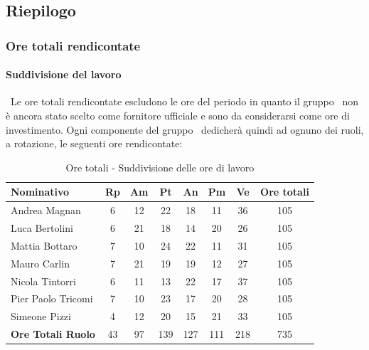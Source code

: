 \documentclass[./PianoDiProgetto.tex]{subfiles}
\begin{document}
\vspace{35mm}	
	
	\subsection{Riepilogo}
			\subsubsection{Ore totali rendicontate}
				\paragraph{Suddivisione del lavoro}\
					Le ore totali rendicontate escludono le ore del periodo \PerAR{} in quanto il gruppo \GRUPPO\ non è ancora stato scelto come fornitore ufficiale e sono da considerarsi come ore di investimento. Ogni componente del gruppo \GRUPPO\ dedicherà quindi ad ognuno dei ruoli, a rotazione, le seguenti ore rendicontate:
	
	\begin{table}[H]
		\begin{tabularx}{\textwidth}{l  * {6}{c}  c}
			\toprule
			\textbf{Nominativo} & \textbf{Rp} & \textbf{Am} & \textbf{Pt} 
						& \textbf{An} & \textbf{Pm} & \textbf{Ve} & \textbf{Ore totali} \\
			\midrule
			Andrea Magnan  & 6  & 12 & 22 & 18 & 11  & 36 & 105 \\
			Luca Bertolini  & 6 & 21 & 18 & 14 & 20 & 26 & 105 \\
			Mattia Bottaro  & 7  & 10 & 24 & 22 & 11  & 31 & 105 \\
			Mauro Carlin  & 7 & 21 & 19 & 19 & 12 & 27 & 105 \\
			Nicola Tintorri  & 6 & 11 & 13 & 22 & 17 & 37 & 105 \\
			Pier Paolo Tricomi  & 7 & 10 & 23 & 17 & 20 & 28 & 105 \\
			Simeone Pizzi & 4 & 12 & 20 & 15 & 21 & 33 & 105 \\
			\midrule
			\textbf{Ore Totali Ruolo} & 43    & 97   & 139   & 127   & 111 & 218   & 735 \\
			\bottomrule
		\end{tabularx}
		\caption{Ore totali - Suddivisione delle ore di lavoro}
	\end{table}
	

\vfill
		
\end{document}
